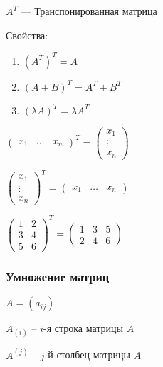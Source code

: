 \( A^T\) ---  Транспонированная матрица

Свойства:
\begin{enumerate}[label=(\arabic*), nosep]
	\item \( (A^T)^T = A \)
	\item \( (A + B)^T = A^T + B^T \)
	\item \( (\lambda A)^T = \lambda A^T \)
\end{enumerate}

\begin{example}
	\( \begin{pmatrix}
		x_1 & \dots & x_n
	\end{pmatrix}^T = \begin{pmatrix}
		x_1 \\ \vdots \\ x_n
	\end{pmatrix} \)
\end{example}
\begin{example}
	\( \begin{pmatrix}
	x_1 \\ \vdots \\ x_n
	\end{pmatrix}^T = \begin{pmatrix}
	x_1 & \dots & x_n
	\end{pmatrix} \)
\end{example}
\begin{example}
	\( \begin{pmatrix}
		1 & 2 \\ 3 & 4 \\ 5 & 6
	\end{pmatrix}^T = \begin{pmatrix}
		1 & 3 & 5 \\
		2 & 4 & 6
	\end{pmatrix} \)
\end{example}

\subsubsection{Умножение матриц}

\( A = (a_{ij})\)


\( A_{(i)} \) -- \(i\)-я строка матрицы \( A \)

\( A^{(j)}\) -- \(j\)-й  столбец матрицы \( A \)

